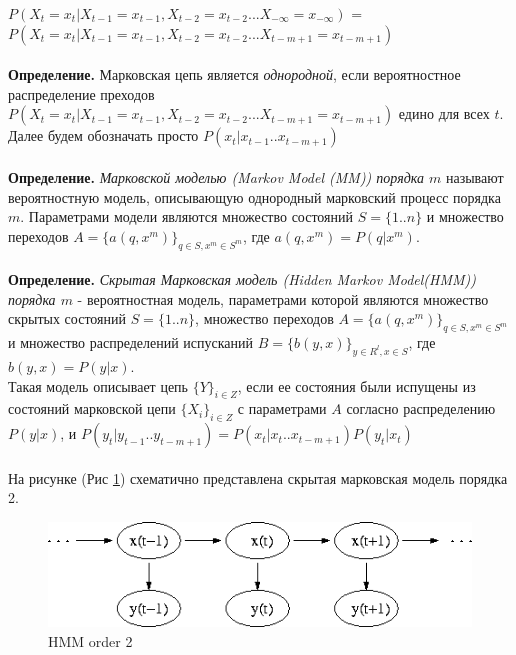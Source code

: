 \documentclass[10pt,a4paper]{article}
\begin{document}
$ P(X_{t} = x_{t}|X_{t-1}=x_{t-1},X_{t-2}=x_{t-2} ... X_{-\infty}=x_{-\infty})$ = 
$ P(X_{t} = x_{t}|X_{t-1}=x_{t-1},X_{t-2}=x_{t-2} ... X_{t-m+1}=x_{t-m+1}) $ 
\\\\
\textbf{Определение.} Марковская цепь является \textit{однородной}, если вероятностное распределение преходов $P(X_{t} = x_{t}|X_{t-1}=x_{t-1},X_{t-2}=x_{t-2} ... X_{t-m+1}=x_{t-m+1})$ едино для всех $ t $.
\\
Далее будем обозначать просто $ P(x_{t}|x_{t-1}..x_{t-m+1})$
\\\\
\textbf{Определение.} \emph{Марковской моделью (Markov Model (MM)) порядка $ m $} называют вероятностную модель, описывающую однородный марковский процесс порядка $ m $.
Параметрами модели являются множество состояний $ S = \{1..n\} $ и множество переходов $ A = \{a(q, x^{m})\}_{q \in S, x^{m} \in S^{m}}$, где $a(q, x^{m}) = P(q|x^{m})$. 
\\\\
\textbf{Определение.} \emph{Скрытая Марковская модель (Hidden Markov Model(HMM)) порядка $ m $} - вероятностная модель, параметрами которой являются множество скрытых состояний $ S = \{1..n\} $, множество переходов $ A = \{a(q, x^{m})\}_{q \in S, x^{m} \in S^{m}}$ и множество распределений испусканий $ B = \{b(y,x)\}_{y \in R^{l}, x \in S}$, где $ b(y, x) = P(y|x)$. 
\\
Такая модель описывает цепь $\{Y\}_{i \in Z}$, если ее состояния были испущены из состояний марковской цепи $\{X_{i}\}_{i \in Z}$ с параметрами $ A $ согласно распределению $ P(y|x) $, и $ P(y_{t}|y_{t-1}..y_{t-m+1}) = P(x_{t}|x_{t}..x_{t-m+1})P(y_t|x_t)$  
\\\\
На рисунке (Рис \ref{ris:image}) схематично представлена скрытая марковская модель порядка 2.
\\
\begin{figure}[hbtp]
\includegraphics[scale=0.4]{img/Hmm_temporal_bayesian_net.png}
\centering
\caption{HMM order 2}
\label{ris:image}
\end{figure}
\\\\
\end{document}
